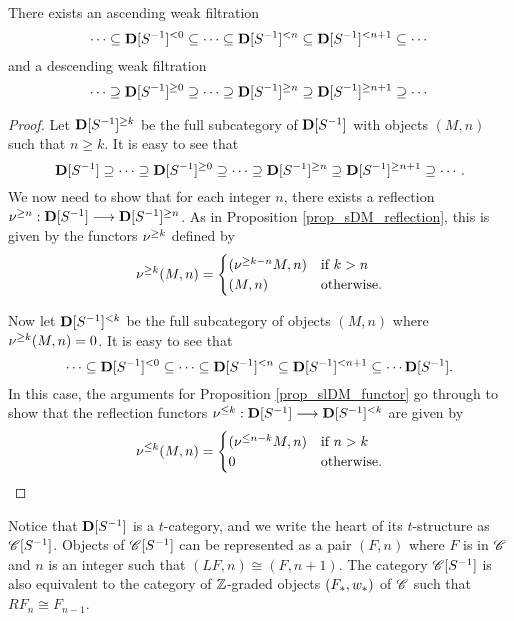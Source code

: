 \begin{thm}\label{thm_summary_dloc}
There exists an ascending weak filtration
\[
\cdots \subseteq \Corad{0}{\DCatLoc{S}} \subseteq \cdots \subseteq 
   \Corad{n}{\DCatLoc{S}} \subseteq \Corad{n + 1}{\DCatLoc{S}}
   \subseteq \cdots
\]
and a descending weak filtration
\[
\cdots \supseteq \Prerad{0}{\DCatLoc{S}} \supseteq \cdots \supseteq 
   \Prerad{n}{\DCatLoc{S}} \supseteq \Prerad{n + 1}{\DCatLoc{S}}
   \supseteq \cdots
\]
\end{thm}
\begin{proof}
Let $\Prerad{k}{\DCatLoc{S}}$ be the full subcategory of 
$\DCatLoc{S}$ with objects $(M, n)$ such that $n \geq k$. It is
easy to see that
\[
\DCatLoc{S} \supseteq \cdots \supseteq \Prerad{0}{\DCatLoc{S}}
   \supseteq \cdots \supseteq \Prerad{n}{\DCatLoc{S}} \supseteq 
   \Prerad{n + 1}{\DCatLoc{S}} \supseteq \cdots.
\]
We now need to show that for each integer $n$, there exists a 
reflection $\preradD{n}: \DCatLoc{S} \to \Prerad{n}{\DCatLoc{S}}$.
As in Proposition \ref{prop_sDM_reflection}, this is given by the
functors $\preradD{k}$ defined by
\[
\preradD{k}(M, n) = \begin{cases}
(\preradD{k - n}M, n) &\textrm{if }k > n\\
(M, n) &\textrm{otherwise}.
\end{cases}
\]

Now let $\Corad{k}{\DCatLoc{S}}$ be the full subcategory of
objects $(M, n)$ where $\preradD{k}(M, n) = 0$. It is easy to
see that
\[
\cdots \subseteq \Corad{0}{\DCatLoc{S}} \subseteq \cdots \subseteq 
   \Corad{n}{\DCatLoc{S}} \subseteq \Corad{n + 1}{\DCatLoc{S}}
   \subseteq \cdots \DCatLoc{S}.
\]
In this case, the arguments for Proposition \ref{prop_slDM_functor} go through 
to show that the reflection functors $\coradD{k} : \DCatLoc{S}
\to \Corad{k}{\DCatLoc{S}}$ are given by
\[
\coradD{k}(M, n) = \begin{cases}
(\coradD{n - k}M, n) &\textrm{if }n > k\\
0                    &\textrm{otherwise}.
\end{cases}
\]
\end{proof}

Notice that $\DCatLoc{S}$ is a $t$-category, and we write the
heart of its $t$-structure as $\CatLoc{C}{S}$. Objects of 
$\CatLoc{C}{S}$ can be represented as a pair $(F, n)$ where
$F$ is in $\Cat{C}$ and $n$ is an integer such that $(LF, n) 
\cong (F, n + 1)$. The category $\CatLoc{C}{S}$ is also equivalent
to the category of $\Z$-graded objects $(F_*, \deloop_*)$ of 
$\Cat{C}$ such that $RF_n \cong F_{n - 1}$.

